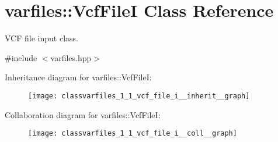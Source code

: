 \hypertarget{classvarfiles_1_1_vcf_file_i}{}\section{varfiles\+:\+:Vcf\+FileI Class Reference}
\label{classvarfiles_1_1_vcf_file_i}


V\+CF file input class.  




{\ttfamily \#include $<$varfiles.\+hpp$>$}



Inheritance diagram for varfiles\+:\+:Vcf\+FileI\+:\nopagebreak
\begin{figure}[H]
\begin{center}
\leavevmode
\texttt{[image: classvarfiles\_1\_1\_vcf\_file\_i\_\_inherit\_\_graph]}
\end{center}
\end{figure}


Collaboration diagram for varfiles\+:\+:Vcf\+FileI\+:\nopagebreak
\begin{figure}[H]
\begin{center}
\leavevmode
\texttt{[image: classvarfiles\_1\_1\_vcf\_file\_i\_\_coll\_\_graph]}
\end{center}
\end{figure}
